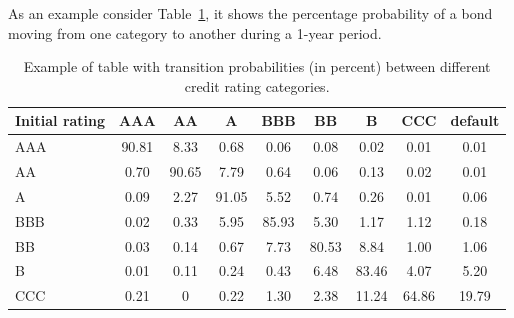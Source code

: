 As an example consider Table~\ref{tab:credit_ratings}, it shows the percentage probability of a bond moving from one category to another during a 1-year period.

\begin{table}[htb]
	\centering
	\begin{tabular}{|l|c|c|c|c|c|c|c|c|}
	\hline
	Initial rating & AAA & AA & A & BBB & BB & B & CCC & default \\
	\hline
	\hline
	AAA & 90.81 & 8.33 & 0.68 & 0.06 & 0.08 & 0.02 & 0.01& 0.01 \\ 
	\hline
	AA & 0.70 & 90.65 & 7.79 & 0.64 & 0.06 & 0.13 & 0.02 & 0.01 \\ 
	\hline
	A & 0.09 & 2.27 & 91.05 & 5.52 & 0.74 & 0.26 & 0.01 & 0.06 \\ 
	\hline
	BBB & 0.02 & 0.33 & 5.95 & 85.93 & 5.30 & 1.17 & 1.12 & 0.18 \\
	\hline
	BB & 0.03 & 0.14 & 0.67 & 7.73 & 80.53 & 8.84 & 1.00 & 1.06 \\
	\hline
	B & 0.01 & 0.11 & 0.24 & 0.43 & 6.48 & 83.46 & 4.07 & 5.20 \\
	\hline
	CCC & 0.21 & 0 & 0.22 & 1.30 & 2.38 & 11.24 & 64.86 & 19.79 \\		
	\hline
\end{tabular}
\caption{Example of table with transition probabilities (in percent) between different credit rating categories.}
\label{tab:credit_ratings}
\end{table}


